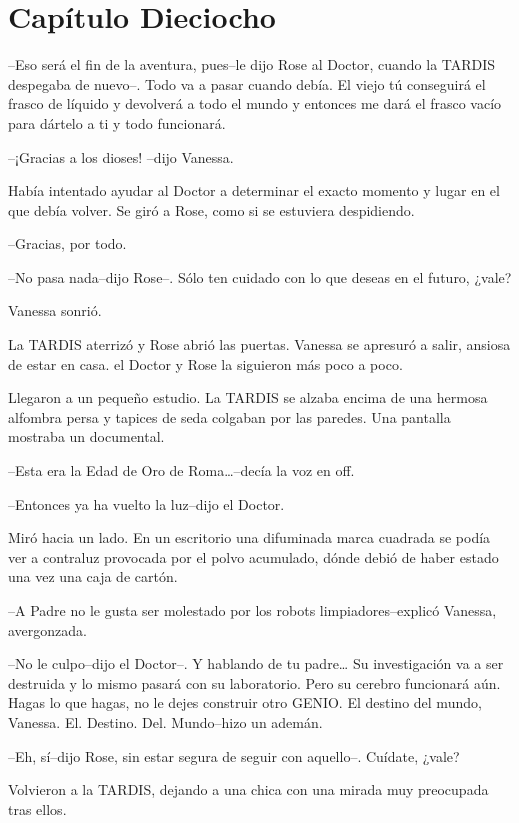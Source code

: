 \chapter*{Capítulo Dieciocho}

--Eso será el fin de la aventura, pues--le dijo Rose al Doctor, cuando
la TARDIS despegaba de nuevo--. Todo va a pasar cuando debía. El viejo
tú conseguirá el frasco de líquido y devolverá a todo el mundo y
entonces me dará el frasco vacío para dártelo a ti y todo funcionará.

--¡Gracias a los dioses! --dijo Vanessa.

Había intentado ayudar al Doctor a determinar el exacto momento y lugar
en el que debía volver. Se giró a Rose, como si se estuviera
despidiendo.

--Gracias, por todo.

--No pasa nada--dijo Rose--. Sólo ten cuidado con lo que deseas en el
futuro, ¿vale?

Vanessa sonrió.

La TARDIS aterrizó y Rose abrió las puertas. Vanessa se apresuró a
salir, ansiosa de estar en casa. el Doctor y Rose la siguieron más poco
a poco.

Llegaron a un pequeño estudio. La TARDIS se alzaba encima de una hermosa
alfombra persa y tapices de seda colgaban por las paredes. Una pantalla
mostraba un documental.

--Esta era la Edad de Oro de Roma\ldots{}--decía la voz en off.

--Entonces ya ha vuelto la luz--dijo el Doctor.

Miró hacia un lado. En un escritorio una difuminada marca cuadrada se
podía ver a contraluz provocada por el polvo acumulado, dónde debió de
haber estado una vez una caja de cartón.

--A Padre no le gusta ser molestado por los robots limpiadores--explicó
Vanessa, avergonzada.

--No le culpo--dijo el Doctor--. Y hablando de tu padre\ldots{} Su
investigación va a ser destruida y lo mismo pasará con su laboratorio.
Pero su cerebro funcionará aún. Hagas lo que hagas, no le dejes
construir otro GENIO. El destino del mundo, Vanessa. El. Destino. Del.
Mundo--hizo un ademán.

--Eh, sí--dijo Rose, sin estar segura de seguir con aquello--. Cuídate,
¿vale?

Volvieron a la TARDIS, dejando a una chica con una mirada muy preocupada
tras ellos.

